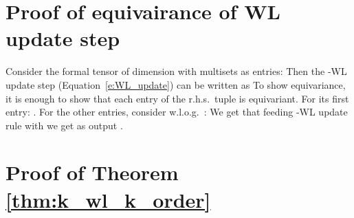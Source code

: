 \documentclass{article}
\def\Eqref#1{Equation~\ref{#1}}
\begin{document}
\section{Proof of equivairance of WL update step}\label{app:thm_equi_wl}
Consider the formal tensor  of dimension  with multisets as entries:
 Then the -WL update step (\Eqref{e:WL_update}) can be written as 
 To show equivariance, it is enough to show that each entry of the r.h.s.~tuple is equivariant. For its  first entry: . For the other entries, consider w.l.o.g.~: 
 We get that feeding -WL update rule with   we get as output . 




\section{Proof of Theorem \ref{thm:k_wl_k_order}}\label{app:thm1}
\end{document}
